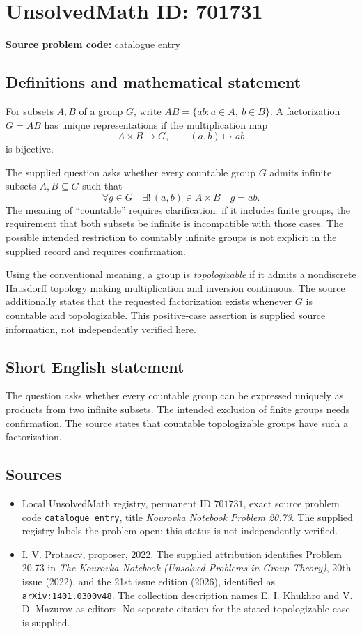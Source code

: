 \documentclass[11pt]{article}
\begin{document}
\section*{UnsolvedMath ID: 701731}
\textbf{Source problem code:} catalogue entry
\subsection{Definitions and mathematical statement}
For subsets \(A,B\) of a group \(G\), write \(AB=\{ab:a\in A,\ b\in B\}\). A factorization \(G=AB\) has unique representations if the multiplication map
\[
A\times B\longrightarrow G,\qquad (a,b)\longmapsto ab
\]
is bijective.

The supplied question asks whether every countable group \(G\) admits infinite subsets \(A,B\subseteq G\) such that
\[
\forall g\in G\quad \exists!\,(a,b)\in A\times B\quad g=ab.
\]
The meaning of ``countable'' requires clarification: if it includes finite groups, the requirement that both subsets be infinite is incompatible with those cases. The possible intended restriction to countably infinite groups is not explicit in the supplied record and requires confirmation.

Using the conventional meaning, a group is \emph{topologizable} if it admits a nondiscrete Hausdorff topology making multiplication and inversion continuous. The source additionally states that the requested factorization exists whenever \(G\) is countable and topologizable. This positive-case assertion is supplied source information, not independently verified here.
\subsection{Short English statement}
The question asks whether every countable group can be expressed uniquely as products from two infinite subsets. The intended exclusion of finite groups needs confirmation. The source states that countable topologizable groups have such a factorization.
\subsection{Sources}
\begin{itemize}
\item Local UnsolvedMath registry, permanent ID \(701731\), exact source problem code \texttt{catalogue entry}, title \emph{Kourovka Notebook Problem 20.73}. The supplied registry labels the problem open; this status is not independently verified.
\item I. V. Protasov, proposer, 2022. The supplied attribution identifies Problem 20.73 in \emph{The Kourovka Notebook (Unsolved Problems in Group Theory)}, 20th issue (2022), and the 21st issue edition (2026), identified as \texttt{arXiv:1401.0300v48}. The collection description names E. I. Khukhro and V. D. Mazurov as editors. No separate citation for the stated topologizable case is supplied.
\end{itemize}
\end{document}
